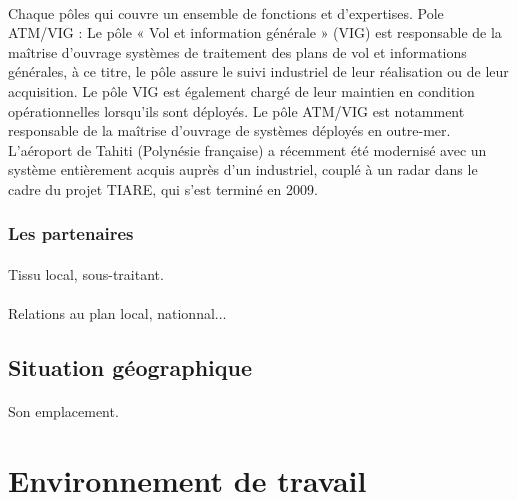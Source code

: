             \paragraph{}
Chaque pôles qui couvre un ensemble de fonctions et d’expertises.
Pole ATM/VIG :
Le pôle « Vol et information générale » (VIG) est responsable de la maîtrise d’ouvrage systèmes de traitement des plans de vol et informations générales, à ce titre, le pôle assure le suivi industriel de leur réalisation ou de leur acquisition. Le pôle VIG est également chargé de leur maintien en condition opérationnelles lorsqu’ils sont déployés.
Le pôle ATM/VIG est notamment responsable de la maîtrise d’ouvrage de systèmes déployés en outre-mer. L’aéroport de Tahiti (Polynésie française) a récemment été modernisé avec un système entièrement acquis auprès d’un industriel, couplé à un radar dans le cadre du projet TIARE, qui s’est terminé en 2009.

    \subsubsection{Les partenaires}
        \paragraph{}
        Tissu local, sous-traitant.
        \paragraph{}
        Relations au plan local, nationnal...

    \subsection{Situation géographique}
        \paragraph{}
        Son emplacement.


\newpage

\section{Environnement de travail}
